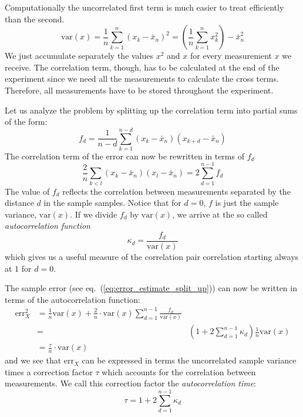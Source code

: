 \documentclass[graybox,sectrefs,envcountresetchap,open=right]{svmonodo}
\begin{document}
Computationally the uncorrelated first term is much easier to treat
efficiently than the second.
\[
\mathrm{var}(x) = \frac{1}{n}\sum_{k=1}^n (x_k - \bar x_n)^2 =
\left(\frac{1}{n}\sum_{k=1}^n x_k^2\right) - \bar x_n^2
\]
We just accumulate separately the values $x^2$ and $x$ for every
measurement $x$ we receive. The correlation term, though, has to be
calculated at the end of the experiment since we need all the
measurements to calculate the cross terms. Therefore, all measurements
have to be stored throughout the experiment.








Let us analyze the problem by splitting up the correlation term into
partial sums of the form:
\[
f_d = \frac{1}{n-d}\sum_{k=1}^{n-d}(x_k - \bar x_n)(x_{k+d} - \bar x_n)
\]
The correlation term of the error can now be rewritten in terms of
$f_d$
\[
\frac{2}{n}\sum_{k<l} (x_k - \bar x_n)(x_l - \bar x_n) =
2\sum_{d=1}^{n-1} f_d
\]
The value of $f_d$ reflects the correlation between measurements
separated by the distance $d$ in the sample samples.  Notice that for
$d=0$, $f$ is just the sample variance, $\mathrm{var}(x)$. If we divide $f_d$
by $\mathrm{var}(x)$, we arrive at the so called \emph{autocorrelation function}
\[
\kappa_d = \frac{f_d}{\mathrm{var}(x)}
\]
which gives us a useful measure of the correlation pair correlation
starting always at $1$ for $d=0$.






The sample error (see eq.~(\ref{eq:error_estimate_split_up})) can now be
written in terms of the autocorrelation function:
\begin{align}
\mathrm{err}_X^2 &=
\frac{1}{n}\mathrm{var}(x)+\frac{2}{n}\cdot\mathrm{var}(x)\sum_{d=1}^{n-1}
\frac{f_d}{\mathrm{var}(x)}\nonumber\\ &=&
\left(1+2\sum_{d=1}^{n-1}\kappa_d\right)\frac{1}{n}\mathrm{var}(x)\nonumber\\
&=\frac{\tau}{n}\cdot\mathrm{var}(x)
\label{eq:error_estimate_corr_time}
\end{align}
and we see that $\mathrm{err}_X$ can be expressed in terms the
uncorrelated sample variance times a correction factor $\tau$ which
accounts for the correlation between measurements. We call this
correction factor the \emph{autocorrelation time}:
\begin{equation}
\tau = 1+2\sum_{d=1}^{n-1}\kappa_d
\label{eq:autocorrelation_time}
\end{equation}
\end{document}
